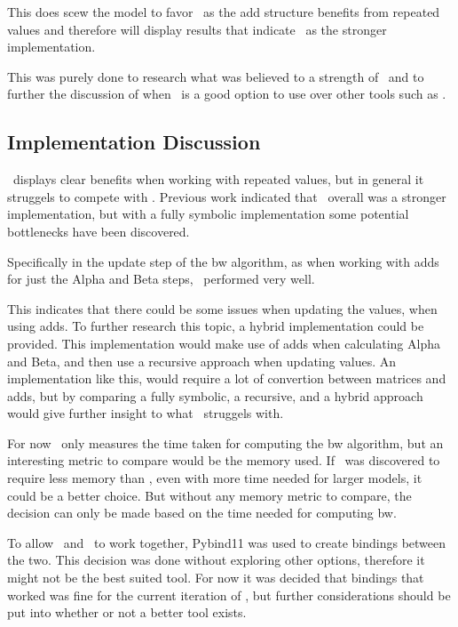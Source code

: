 This does scew the model to favor \Cupaal\ as the \gls{add} structure benefits from repeated values and therefore will display results that indicate \Cupaal\ as the stronger implementation.

This was purely done to research what was believed to a strength of \Cupaal\ and to further the discussion of when \Cupaal\ is a good option to use over other tools such as \Jajapy.


\subsection{Implementation Discussion} \label{subsec:implementation_discussion}
\Cupaal\ displays clear benefits when working with repeated values, but in general it struggels to compete with \Jajapy.
Previous work indicated that \Cupaal\ overall was a stronger implementation, but with a fully symbolic implementation some potential bottlenecks have been discovered.

Specifically in the update step of the \gls{bw} algorithm, as when working with \glspl{add} for just the Alpha and Beta steps, \Cupaal\ performed very well.

This indicates that there could be some issues when updating the values, when using \glspl{add}.
To further research this topic, a hybrid implementation could be provided.
This implementation would make use of \glspl{add} when calculating Alpha and Beta, and then use a recursive approach when updating values.
An implementation like this, would require a lot of convertion between matrices and \glspl{add}, but by comparing a fully symbolic, a recursive, and a hybrid approach would give further insight to what \Cupaal\ struggels with.

For now \Cupaal\ only measures the time taken for computing the \gls{bw} algorithm, but an interesting metric to compare would be the memory used.
If \Cupaal\ was discovered to require less memory than \Jajapy, even with more time needed for larger models, it could be a better choice.
But without any memory metric to compare, the decision can only be made based on the time needed for computing \gls{bw}.

To allow \Cupaal\ and \Jajapy\ to work together, Pybind11 was used to create bindings between the two.
This decision was done without exploring other options, therefore it might not be the best suited tool.
For now it was decided that bindings that worked was fine for the current iteration of \Cupaal, but further considerations should be put into whether or not a better tool exists.

